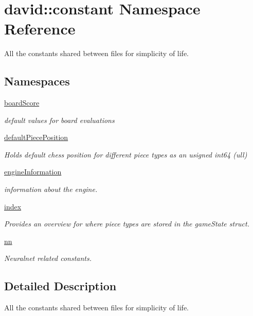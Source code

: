 \hypertarget{namespacedavid_1_1constant}{}\section{david\+:\+:constant Namespace Reference}
\label{namespacedavid_1_1constant}


All the constants shared between files for simplicity of life.  


\subsection*{Namespaces}
\begin{DoxyCompactItemize}
\item 
 \hyperlink{namespacedavid_1_1constant_1_1boardScore}{board\+Score}
\begin{DoxyCompactList}\small\item\em default values for board evaluations \end{DoxyCompactList}\item 
 \hyperlink{namespacedavid_1_1constant_1_1defaultPiecePosition}{default\+Piece\+Position}
\begin{DoxyCompactList}\small\item\em Holds default chess position for different piece types as an usigned int64 (ull) \end{DoxyCompactList}\item 
 \hyperlink{namespacedavid_1_1constant_1_1engineInformation}{engine\+Information}
\begin{DoxyCompactList}\small\item\em information about the engine. \end{DoxyCompactList}\item 
 \hyperlink{namespacedavid_1_1constant_1_1index}{index}
\begin{DoxyCompactList}\small\item\em Provides an overview for where piece types are stored in the game\+State struct. \end{DoxyCompactList}\item 
 \hyperlink{namespacedavid_1_1constant_1_1nn}{nn}
\begin{DoxyCompactList}\small\item\em Neuralnet related constants. \end{DoxyCompactList}\end{DoxyCompactItemize}


\subsection{Detailed Description}
All the constants shared between files for simplicity of life. 
